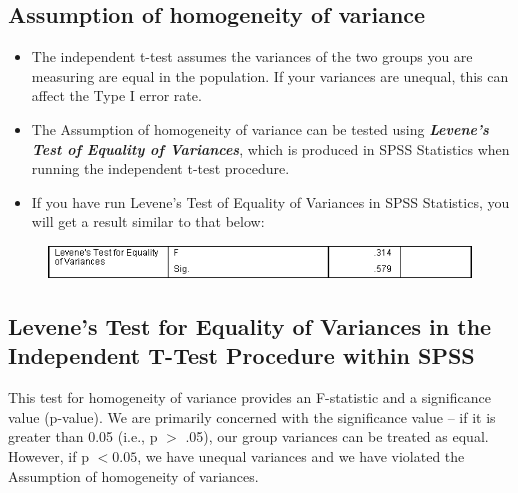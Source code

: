 \documentclass[]{article}
\begin{document}
\subsection*{Assumption of homogeneity of variance}
\begin{itemize}
	\item The independent t-test assumes the variances of the two groups you are measuring are equal in the population. If your variances are unequal, this can affect the Type I error rate. 
	\item The Assumption of homogeneity of variance can be tested using \textbf{\textit{Levene's Test of Equality of Variances}}, which is produced in SPSS Statistics when running the independent t-test procedure.
	\item  If you have run Levene's Test of Equality of Variances in SPSS Statistics, you will get a result similar to that below:
\end{itemize}

\begin{figure}[h!]
\centering
\includegraphics[width=0.5\linewidth]{TwoSample/Intro1}
\label{fig:intro1}
\end{figure}

\subsection{Levene's Test for Equality of Variances in the Independent T-Test Procedure within SPSS}
This test for homogeneity of variance provides an F-statistic and a significance value (p-value). We are primarily concerned with the significance value – if it is greater than 0.05 (i.e., p $>$ .05), our group variances can be treated as equal. However, if p $< 0.05$, we have unequal variances and we have violated the 
Assumption of homogeneity of variances.

\end{document}
